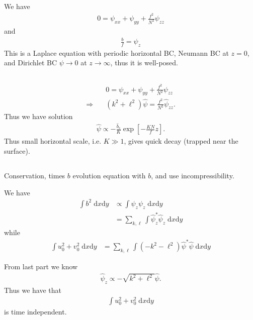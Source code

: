\documentclass[11pt,letterpaper]{book}
\theoremstyle{definition}
\newcommand{\de}{\mathrm{d}}
\newcommand{\thus}{\Rightarrow \quad }
\begin{document}
\subsection{}
We have
\begin{align*}
    0 = \psi_{xx}+\psi_{yy}+\frac{f^2}{N^2}\psi_{zz}
\end{align*}
and
\begin{align*}
    \frac{b}{f} = \psi_z
\end{align*}
This is a Laplace equation with periodic horizontal BC, Neumann BC at $z=0$, and Dirichlet BC $\psi\to 0$ at $z\to \infty$, thus it is well-posed.

\subsection{}
\begin{align*}
    &0 = \psi_{xx}+\psi_{yy}+\frac{f^2}{N^2}\psi_{zz}\\
    \thus &(k^2+\ell^2)\hat{\psi} = \frac{f^2}{N^2}\hat\psi_{zz}.
\end{align*}
Thus we have solution
\begin{align*}
    \hat{\psi} \propto -\frac{\hat b_s}{K}\exp\left[-\frac{KN}{f}z\right].
\end{align*}
Thus small horizontal scale, i.e. $K\gg 1$, gives quick decay (trapped near the surface).

\subsection{}
Conservation, times $b$ evolution equation with $b$, and use incompressibility.

We have
\begin{align*}
    \int b^2\;\de x\de y &\propto \int {\psi}_z{\psi}_z\;\de x\de y\\
    &= \sum_{k,\ell}\int  \hat{\psi}_z^*\hat{\psi}_z\;\de x\de y
\end{align*}
while
\begin{align*}
    \int u_0^2+v_0^2\;\de x\de y &= \sum_{k,\ell}\int (-k^2-\ell^2)\hat{\psi}^*\hat{\psi}\;\de x\de y
\end{align*}

From last part we know
\begin{align*}
    \hat{\psi}_{z}\propto -\sqrt{k^2+\ell^2}\hat{\psi}.
\end{align*}
Thus we have that
\begin{align*}
    \int u_0^2+v_0^2\;\de x\de y
\end{align*}
is time independent.
\end{document}
